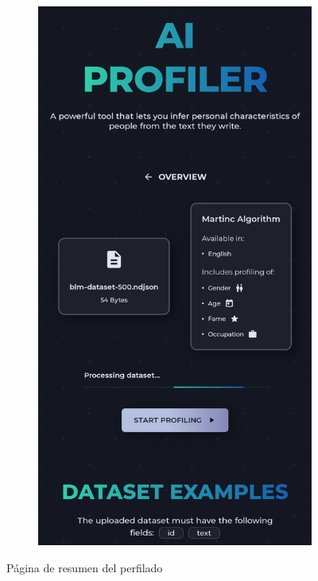 \begin{figure}[H]
\begin{subfigure}[c]{0.21\textwidth}
			\includegraphics[width=\textwidth]{imagenes/overview_movil.png}
			\label{fig:casouso_overview_movil}
	\end{subfigure}
	\vspace{-1\baselineskip}
	\caption{Página de resumen del perfilado}
	\label{fig:casouso_overview}
\end{figure}

